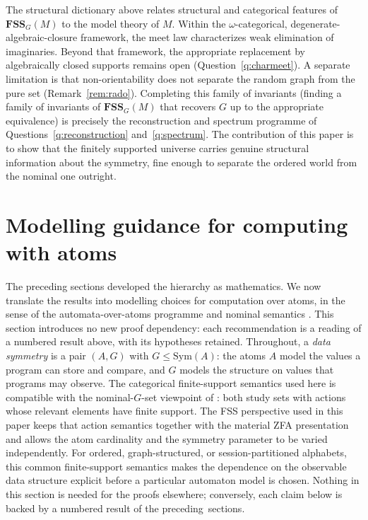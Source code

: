 \documentclass{lmcs}
\newcommand{\Sym}{\mathrm{Sym}}
\newcommand{\FSS}{\mathbf{FSS}}
\begin{document}
\begin{rem}\label{rem:method}
The structural dictionary above relates structural and categorical
features of $\FSS_G(M)$ to the model theory of $M$. Within the $\omega$-categorical, degenerate-algebraic-closure framework, the meet law characterizes weak elimination of imaginaries.
Beyond that framework, the appropriate replacement by algebraically closed
supports remains open (Question~\ref{q:charmeet}). A separate
limitation is that non-orientability does not separate
the random graph from the pure set (Remark~\ref{rem:rado}). Completing this family of invariants (finding a family of invariants of $\FSS_G(M)$ that recovers $G$ up to the appropriate equivalence) is precisely the reconstruction and spectrum programme of
Questions~\ref{q:reconstruction} and~\ref{q:spectrum}. The contribution of this paper is to show that the finitely supported universe carries genuine structural information about the symmetry, fine enough to separate the ordered world from the nominal one outright.
\end{rem}

\section{Modelling guidance for computing with atoms}\label{sec:modelling}

The preceding sections developed the hierarchy as mathematics. We now
translate the results into modelling choices for computation over atoms, in
the sense of the automata-over-atoms programme \cite{BKL14} and nominal
semantics \cite{Pitts13}. This section introduces no new proof dependency:
each recommendation is a reading of a numbered result above, with its
hypotheses retained.
Throughout, a \emph{data symmetry} is a pair $(A,G)$ with $G\leq\Sym(A)$: the atoms $A$ model the values a program can store and compare, and $G$ models the structure on values that programs may observe.
The categorical finite-support semantics used here is compatible with the nominal-$G$-set viewpoint of \cite{BKL14}: both study sets with actions whose relevant elements have finite support. The FSS perspective used in this paper keeps that action semantics together with the material ZFA presentation and allows the atom cardinality and the symmetry parameter to be varied independently. For ordered, graph-structured, or session-partitioned alphabets, this common finite-support semantics makes the dependence on the observable data structure explicit before a particular automaton model is chosen. Nothing in this section is needed for the proofs elsewhere; conversely, each claim below is backed by a numbered result of the preceding~sections.
\end{document}
